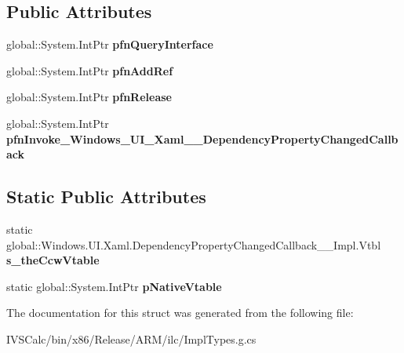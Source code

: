 \subsection*{Public Attributes}
\begin{DoxyCompactItemize}
\item 
\mbox{\label{struct_windows_1_1_u_i_1_1_xaml_1_1_dependency_property_changed_callback_____impl_1_1_vtbl_a8f35c6ba1adf71ed212cfbc3d5526d34}} 
global\+::\+System.\+Int\+Ptr {\bfseries pfn\+Query\+Interface}
\item 
\mbox{\label{struct_windows_1_1_u_i_1_1_xaml_1_1_dependency_property_changed_callback_____impl_1_1_vtbl_ab84e32bfea463d29bcf97620e7235f82}} 
global\+::\+System.\+Int\+Ptr {\bfseries pfn\+Add\+Ref}
\item 
\mbox{\label{struct_windows_1_1_u_i_1_1_xaml_1_1_dependency_property_changed_callback_____impl_1_1_vtbl_ab1d8ab933e290c64cc16cdf95a0a5bd8}} 
global\+::\+System.\+Int\+Ptr {\bfseries pfn\+Release}
\item 
\mbox{\label{struct_windows_1_1_u_i_1_1_xaml_1_1_dependency_property_changed_callback_____impl_1_1_vtbl_a6e0dee4ef6040bab0fec4db511316992}} 
global\+::\+System.\+Int\+Ptr {\bfseries pfn\+Invoke\+\_\+\+Windows\+\_\+\+U\+I\+\_\+\+Xaml\+\_\+\+\_\+\+Dependency\+Property\+Changed\+Callback}
\end{DoxyCompactItemize}
\subsection*{Static Public Attributes}
\begin{DoxyCompactItemize}
\item 
\mbox{\label{struct_windows_1_1_u_i_1_1_xaml_1_1_dependency_property_changed_callback_____impl_1_1_vtbl_a043d2edc89d1bb4e72b3c9b3ed8b00c4}} 
static global\+::\+Windows.\+U\+I.\+Xaml.\+Dependency\+Property\+Changed\+Callback\+\_\+\+\_\+\+Impl.\+Vtbl {\bfseries s\+\_\+the\+Ccw\+Vtable}
\item 
\mbox{\label{struct_windows_1_1_u_i_1_1_xaml_1_1_dependency_property_changed_callback_____impl_1_1_vtbl_a7c7bd44d36506a53235178d222cb6db6}} 
static global\+::\+System.\+Int\+Ptr {\bfseries p\+Native\+Vtable}
\end{DoxyCompactItemize}


The documentation for this struct was generated from the following file\+:\begin{DoxyCompactItemize}
\item 
I\+V\+S\+Calc/bin/x86/\+Release/\+A\+R\+M/ilc/Impl\+Types.\+g.\+cs\end{DoxyCompactItemize}
